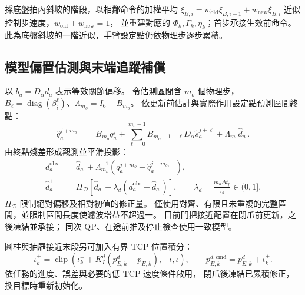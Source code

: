 採底盤拍內斜坡的階段，以相鄰命令的加權平均
$\bar\xi_{B,i}=w_{\mathrm{old}}\xi_{B,i-1}+w_{\mathrm{new}}\xi_{B,i}$
近似控制步速度，$w_{\mathrm{old}}+w_{\mathrm{new}}=1$，
並重建對應的 $\Phi_k,\Gamma_k,\eta_k$；首步承接生效前命令。
此為底盤斜坡的一階近似，手臂設定點仍依物理步逐步累積。

\subsection{模型偏置估測與末端追蹤補償}
\label{subsec:model_bias_tcp_compensation}

以 $b_a=D_\alpha d_a$ 表示等效關節偏移。
令估測區間含 $m_o$ 個物理步，
$B_\ell=\operatorname{diag}(\beta_i^\ell)$、$\Lambda_{m_o}=I_6-B_{m_o}$。
依更新前估計與實際作用設定點預測區間終點：
\begin{equation}
    \hat q_a^{j+m_o,-}=
    B_{m_o}q_a^j+
    \sum_{\ell=0}^{m_o-1}
    B_{m_o-1-\ell}D_\alpha\tilde s_a^{j+\ell}
    +\Lambda_{m_o}\hat d_a^- .
    \label{eq:ch3_interval_offset_prediction}
\end{equation}
由終點殘差形成觀測並平滑投影：
\begin{equation}
    \begin{aligned}
        d_a^{\mathrm{obs}}&=\hat d_a^-+
        \Lambda_{m_o}^{-1}(q_a^{j+m_o}-\hat q_a^{j+m_o,-}),\\
        \hat d_a^+&=\Pi_{\mathcal D}
        [\hat d_a^-+\lambda_d(d_a^{\mathrm{obs}}-\hat d_a^-)],
        \qquad \lambda_d=\frac{m_o\Delta t_p}{\tau_d}\in(0,1].
    \end{aligned}
    \label{eq:ch3_interval_offset_update}
\end{equation}
$\Pi_{\mathcal D}$ 限制絕對偏移及相對初值的修正量。
僅使用對齊、有限且未重複的完整區間，並限制區間長度使濾波增益不超過一。
目前門把接近配置在閉爪前更新，之後凍結並承接；
同次 QP、在途前推及停止檢查使用一致模型。

圓柱與抽屜接近末段另可加入有界 TCP 位置積分：
\begin{equation}
    \iota_k^+=\operatorname{clip}
    (\iota_k^-+K_I^d(p_{E,k}^d-p_{E,k}),-\bar\iota,\bar\iota),
    \qquad
    p_{E,k}^{d,\mathrm{cmd}}=p_{E,k}^d+\iota_k^+ .
    \label{eq:ch3_bounded_tcp_target_compensation}
\end{equation}
依任務的進度、誤差與必要的低 TCP 速度條件啟用，
閉爪後凍結已累積修正，換目標時重新初始化。

